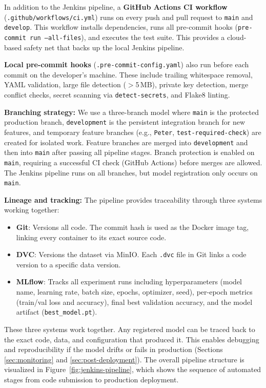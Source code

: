 \documentclass[10pt,twocolumn,letterpaper]{article}
\begin{document}
In addition to the Jenkins pipeline, a \textbf{GitHub Actions CI workflow} (\texttt{.github/workflows/ci.yml}) runs on every push and pull request to \texttt{main} and \texttt{develop}. This workflow installs dependencies, runs all pre-commit hooks (\texttt{pre-commit run --all-files}), and executes the test suite. This provides a cloud-based safety net that backs up the local Jenkins pipeline.

\textbf{Local pre-commit hooks} (\texttt{.pre-commit-config.yaml}) also run before each commit on the developer's machine. These include trailing whitespace removal, YAML validation, large file detection ($>$5\,MB), private key detection, merge conflict checks, secret scanning via \texttt{detect-secrets}, and Flake8 linting.

\textbf{Branching strategy:} We use a three-branch model where \texttt{main} is the protected production branch, \texttt{development} is the persistent integration branch for new features, and temporary feature branches (e.g., \texttt{Peter}, \texttt{test-required-check}) are created for isolated work. Feature branches are merged into \texttt{development} and then into \texttt{main} after passing all pipeline stages. Branch protection is enabled on \texttt{main}, requiring a successful CI check (GitHub Actions) before merges are allowed. The Jenkins pipeline runs on all branches, but model registration only occurs on \texttt{main}.

\textbf{Lineage and tracking:} The pipeline provides traceability through three systems working together:
\begin{itemize}
    \item \textbf{Git}: Versions all code. The commit hash is used as the Docker image tag, linking every container to its exact source code.
    \item \textbf{DVC}: Versions the dataset via MinIO. Each \texttt{.dvc} file in Git links a code version to a specific data version.
    \item \textbf{MLflow}: Tracks all experiment runs including hyperparameters (model name, learning rate, batch size, epochs, optimizer, seed), per-epoch metrics (train/val loss and accuracy), final best validation accuracy, and the model artifact (\texttt{best\_model.pt}).
\end{itemize}

These three systems work together. Any registered model can be traced back to the exact code, data, and configuration that produced it. This enables debugging and reproducibility if the model drifts or fails in production (Sections \ref{sec:monitoring} and \ref{sec:post-deployment}). The overall pipeline structure is visualized in Figure~\ref{fig:jenkins-pipeline}, which shows the sequence of automated stages from code submission to production deployment.
\end{document}
